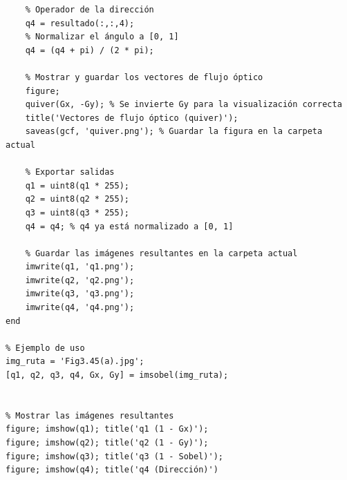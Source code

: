 \documentclass[11pt, letterpaper]{article}
\begin{document}
\begin{verbatim}
	% Operador de la dirección
	q4 = resultado(:,:,4);
	% Normalizar el ángulo a [0, 1]
	q4 = (q4 + pi) / (2 * pi);
	
	% Mostrar y guardar los vectores de flujo óptico
	figure;
	quiver(Gx, -Gy); % Se invierte Gy para la visualización correcta
	title('Vectores de flujo óptico (quiver)');
	saveas(gcf, 'quiver.png'); % Guardar la figura en la carpeta actual
	
	% Exportar salidas
	q1 = uint8(q1 * 255);
	q2 = uint8(q2 * 255);
	q3 = uint8(q3 * 255);
	q4 = q4; % q4 ya está normalizado a [0, 1]
	
	% Guardar las imágenes resultantes en la carpeta actual
	imwrite(q1, 'q1.png');
	imwrite(q2, 'q2.png');
	imwrite(q3, 'q3.png');
	imwrite(q4, 'q4.png');
end

% Ejemplo de uso
img_ruta = 'Fig3.45(a).jpg';
[q1, q2, q3, q4, Gx, Gy] = imsobel(img_ruta);


% Mostrar las imágenes resultantes
figure; imshow(q1); title('q1 (1 - Gx)');
figure; imshow(q2); title('q2 (1 - Gy)');
figure; imshow(q3); title('q3 (1 - Sobel)');
figure; imshow(q4); title('q4 (Dirección)')
\end{verbatim}
	
	
	
	
\end{document}
